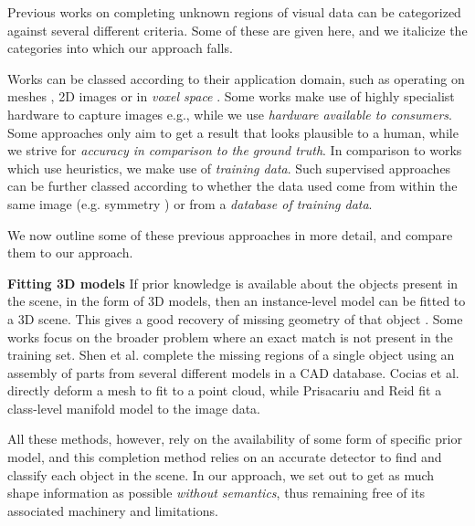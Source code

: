 \documentclass[10pt,twocolumn,letterpaper]{article}
\makeatletter
\renewcommand*{\eg}{e.g.\@\xspace}
\newcommand*{\ea}{et al.\@\xspace}
\makeatother
\begin{document}


Previous works on completing unknown regions of visual data can be categorized against several different criteria.
Some of these are given here, and we italicize the categories into which our approach falls.

Works can be classed according to their application domain, such as operating on meshes \cite{harary-tog-2013, schnabel-eurographics-2009}, 2D images \cite{gupta-cvpr-2011} or in \emph{voxel space} \cite{kim-iccv-2013}.
Some works make use of highly specialist hardware to capture images \eg \cite{velten-nature-2012}, while we use \emph{hardware available to consumers}.
Some approaches only aim to get a result that looks plausible to a human, while we strive for \emph{accuracy in comparison to the ground truth}.
In comparison to works which use heuristics, we make use of \emph{training data}.
Such supervised approaches can be further classed according to whether the data used come from within the same image (\eg symmetry \cite{kroemer-humanoids-2012}) or from a \emph{database of training data}.

We now outline some of these previous approaches in more detail, and compare them to our approach.


\noindent\textbf{Fitting 3D models}
If prior knowledge is available about the objects present in the scene, in the form of 3D models, then an instance-level model can be fitted to a 3D scene.
This gives a good recovery of missing geometry of that object \cite{hinterstoisser-accv-2012, drost-3dimpvt-2012}.
Some works focus on the broader problem where an exact match is not present in the training set.
Shen \ea \cite{shen-tog-2012} complete the missing regions of a single object using an assembly of parts from several different models in a CAD database.
Cocias \ea \cite{cocias-cgvcv-2013} directly deform a mesh to fit to a point cloud, while Prisacariu and Reid \cite{prisacariu-iccv-2011} fit a class-level manifold model to the image data.

All these methods, however, rely on the availability of some form of specific prior model, and this completion method relies on an accurate detector to find and classify each object in the scene.
In our approach, we set out to get as much shape information as possible \emph{without semantics}, thus remaining free of its associated machinery and limitations.
\end{document}
